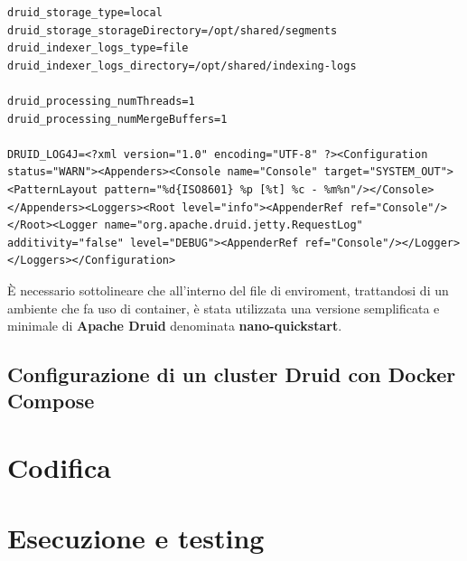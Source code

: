 \begin{lstlisting}
druid_storage_type=local
druid_storage_storageDirectory=/opt/shared/segments
druid_indexer_logs_type=file
druid_indexer_logs_directory=/opt/shared/indexing-logs

druid_processing_numThreads=1
druid_processing_numMergeBuffers=1

DRUID_LOG4J=<?xml version="1.0" encoding="UTF-8" ?><Configuration status="WARN"><Appenders><Console name="Console" target="SYSTEM_OUT"><PatternLayout pattern="%d{ISO8601} %p [%t] %c - %m%n"/></Console></Appenders><Loggers><Root level="info"><AppenderRef ref="Console"/></Root><Logger name="org.apache.druid.jetty.RequestLog" additivity="false" level="DEBUG"><AppenderRef ref="Console"/></Logger></Loggers></Configuration>

\end{lstlisting}
È necessario sottolineare che all'interno del file di enviroment, trattandosi di un ambiente che fa uso di \gls{container}{}, 
è stata utilizzata una versione semplificata e minimale di \textbf{Apache Druid} denominata \textbf{nano-quickstart}.\\
\subsection{Configurazione di un cluster Druid con Docker Compose}

\section{Codifica}

\section{Esecuzione e testing}
\newpage
\pagestyle{empty}
\null %
\newpage